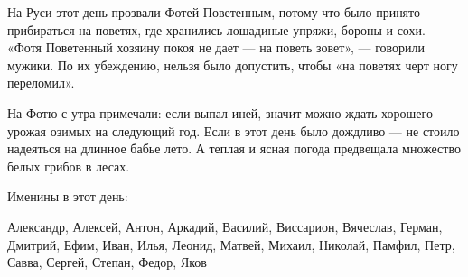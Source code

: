На Руси этот день прозвали Фотей Поветенным, потому что было принято
прибираться на поветях, где хранились лошадиные упряжи, бороны и сохи. «Фотя
Поветенный хозяину покоя не дает — на поветь зовет», — говорили мужики. По их
убеждению, нельзя было допустить, чтобы «на поветях черт ногу переломил».

На Фотю с утра примечали: если выпал иней, значит можно ждать хорошего урожая
озимых на следующий год. Если в этот день было дождливо — не стоило надеяться
на длинное бабье лето. А теплая и ясная погода предвещала множество белых
грибов в лесах.

Именины в этот день:

Александр, Алексей, Антон, Аркадий, Василий, Виссарион, Вячеслав, Герман,
Дмитрий, Ефим, Иван, Илья, Леонид, Матвей, Михаил, Николай, Памфил, Петр,
Савва, Сергей, Степан, Федор, Яков
